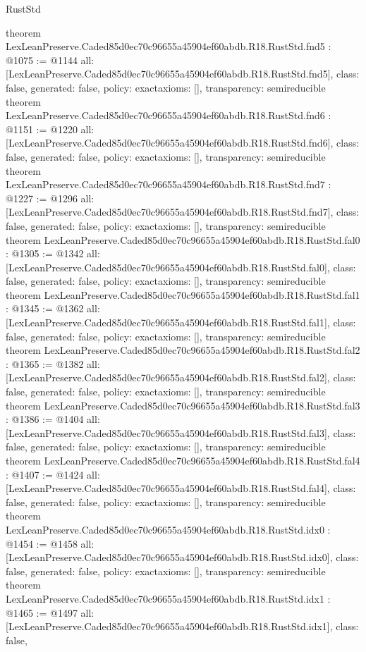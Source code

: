 \begin{lexlean}{RustStd}
\begin{coremodule}
{}
theorem LexLeanPreserve.Caded85d0ec70c96655a45904ef60abdb.R18.RustStd.fnd5 : @1075 := @1144 {
  all: [LexLeanPreserve.Caded85d0ec70c96655a45904ef60abdb.R18.RustStd.fnd5],
  class: false,
  generated: false,
  policy: exact{axioms: []},
  transparency: semireducible
}
theorem LexLeanPreserve.Caded85d0ec70c96655a45904ef60abdb.R18.RustStd.fnd6 : @1151 := @1220 {
  all: [LexLeanPreserve.Caded85d0ec70c96655a45904ef60abdb.R18.RustStd.fnd6],
  class: false,
  generated: false,
  policy: exact{axioms: []},
  transparency: semireducible
}
theorem LexLeanPreserve.Caded85d0ec70c96655a45904ef60abdb.R18.RustStd.fnd7 : @1227 := @1296 {
  all: [LexLeanPreserve.Caded85d0ec70c96655a45904ef60abdb.R18.RustStd.fnd7],
  class: false,
  generated: false,
  policy: exact{axioms: []},
  transparency: semireducible
}
theorem LexLeanPreserve.Caded85d0ec70c96655a45904ef60abdb.R18.RustStd.fal0 : @1305 := @1342 {
  all: [LexLeanPreserve.Caded85d0ec70c96655a45904ef60abdb.R18.RustStd.fal0],
  class: false,
  generated: false,
  policy: exact{axioms: []},
  transparency: semireducible
}
theorem LexLeanPreserve.Caded85d0ec70c96655a45904ef60abdb.R18.RustStd.fal1 : @1345 := @1362 {
  all: [LexLeanPreserve.Caded85d0ec70c96655a45904ef60abdb.R18.RustStd.fal1],
  class: false,
  generated: false,
  policy: exact{axioms: []},
  transparency: semireducible
}
theorem LexLeanPreserve.Caded85d0ec70c96655a45904ef60abdb.R18.RustStd.fal2 : @1365 := @1382 {
  all: [LexLeanPreserve.Caded85d0ec70c96655a45904ef60abdb.R18.RustStd.fal2],
  class: false,
  generated: false,
  policy: exact{axioms: []},
  transparency: semireducible
}
theorem LexLeanPreserve.Caded85d0ec70c96655a45904ef60abdb.R18.RustStd.fal3 : @1386 := @1404 {
  all: [LexLeanPreserve.Caded85d0ec70c96655a45904ef60abdb.R18.RustStd.fal3],
  class: false,
  generated: false,
  policy: exact{axioms: []},
  transparency: semireducible
}
theorem LexLeanPreserve.Caded85d0ec70c96655a45904ef60abdb.R18.RustStd.fal4 : @1407 := @1424 {
  all: [LexLeanPreserve.Caded85d0ec70c96655a45904ef60abdb.R18.RustStd.fal4],
  class: false,
  generated: false,
  policy: exact{axioms: []},
  transparency: semireducible
}
theorem LexLeanPreserve.Caded85d0ec70c96655a45904ef60abdb.R18.RustStd.idx0 : @1454 := @1458 {
  all: [LexLeanPreserve.Caded85d0ec70c96655a45904ef60abdb.R18.RustStd.idx0],
  class: false,
  generated: false,
  policy: exact{axioms: []},
  transparency: semireducible
}
theorem LexLeanPreserve.Caded85d0ec70c96655a45904ef60abdb.R18.RustStd.idx1 : @1465 := @1497 {
  all: [LexLeanPreserve.Caded85d0ec70c96655a45904ef60abdb.R18.RustStd.idx1],
  class: false,
}
\end{coremodule}
\end{lexlean}
